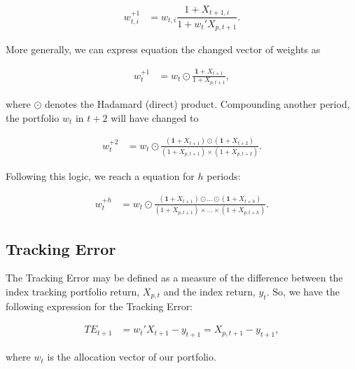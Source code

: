 \documentclass[12pt,oneside,a4paper]{memoir}
\begin{document}
\vspace{-18 pt}
\begin{align*}
	w_{t,i}^{+1} &= w_{t,i} \dfrac{1+X_{t+1,i}}{1+w_{t}'X_{p,t+1}}.
\end{align*}

More generally, we can express equation the changed vector of weights as

\vspace{-18 pt}
\begin{align}
	\label{eq:wplus1}
	w_{t}^{+1} &= w_{t} \odot \frac{\mathbf{1} + X_{t+1}}{1 + X_{p,t+1}},
\end{align}

\noindent
where $\odot$ denotes the Hadamard (direct) product.
Compounding another period, the portfolio $w_{t}$ in $t+2$ will have changed to

\vspace{-18 pt}
\begin{align*}
	w_{t}^{+2} &= w_{t} \odot 
	\frac{(\mathbf{1} + X_{t+1})\odot(\mathbf{1} + X_{t+2})}{(1 + X_{p,t+1})\times(1 + X_{p,t+2})}.
\end{align*}

Following this logic, we reach a equation for $h$ periods:

\vspace{-18 pt}
\begin{align}
	\label{eq:wplush}
	w_{t}^{+h} &= w_{t} \odot 
	\frac{(\mathbf{1} + X_{t+1}) \odot \dots \odot (\mathbf{1} + X_{t+h})}
	{(1 + X_{p,t+1})\times \dots \times(1 + X_{p,t+h})}.
\end{align}

\subsection*{Tracking Error}

The Tracking Error may be defined as a measure of the difference between the index tracking portfolio return, $X_{p,t}$ and the index return, $y_{t}$.
So, we have the following expression for the Tracking Error:

\vspace{-18 pt}
\begin{align} 
	\label{eq:TE}
	TE_{t+1} &= w_{t}'X_{t+1} - y_{t+1} 
	= X_{p, t+1} - y_{t+1},
\end{align}

\noindent
where $w_{t}$ is the allocation vector of our portfolio.
\end{document}
